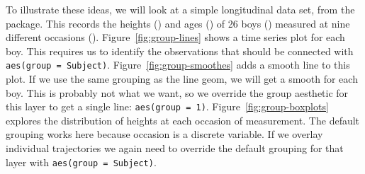 To illustrate these ideas, we will look at a simple longitudinal data set,  from the  package.  This records the heights () and ages () of 26 boys () measured at nine different occasions (). Figure~\ref{fig:group-lines} shows a time series plot for each boy.  This requires us to identify the observations that should be connected with {\tt aes(group = Subject)}.  Figure~\ref{fig:group-smoothes} adds a smooth line to this plot.  If we use the same grouping as the line geom, we will get a smooth for each boy.  This is probably not what we want, so we override the group aesthetic for this layer to get a single line: {\tt aes(group = 1)}.  Figure~\ref{fig:group-boxplots} explores the distribution of heights at each occasion of measurement.  The default grouping works here because occasion is a discrete variable.  If we overlay individual trajectories we again need to override the default grouping for that layer with {\tt aes(group = Subject)}.

% 


% 

 
% 


